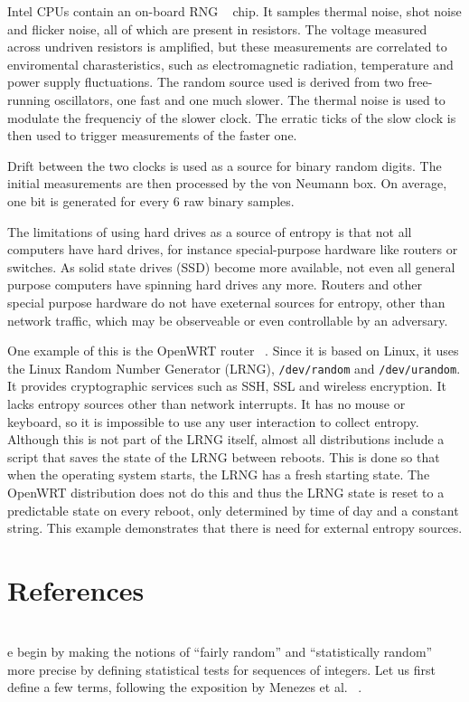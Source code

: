 \documentclass[a4paper]{article}           %
\newcommand{\tmpsection}[1]{}
\let\tmpsection=\section
\renewcommand{\section}[2]{

    \ifthenelse{
      \equal{#2}{*} %
    }
    {
      \tmpsection{References}
      \tmpsection{\sc{#2} }
    }
    {\tmpsection{\sc{#1} } }
      

}
\begin{document}
Intel CPUs contain an on-board RNG ~\cite{intel} chip. It samples thermal noise, shot noise and flicker noise, all of which are present in resistors. The voltage measured across undriven resistors is amplified, but these measurements are correlated to enviromental charasteristics, such as electromagnetic radiation, temperature and power supply fluctuations. The random source used is derived from two free-running oscillators, one fast and one much slower. The thermal noise is used to modulate the frequenciy of the slower clock. The erratic ticks of the slow clock is then used to trigger measurements of the faster one.

Drift between the two clocks is used as a source for binary random digits. The initial measurements are then processed by the von Neumann box. On average, one bit is generated for every 6 raw binary samples. 

The limitations of using hard drives as a source of entropy is that not all computers have hard drives, for instance special-purpose hardware like routers or switches. As solid state drives (SSD) become more available, not even all general purpose computers have spinning hard drives any more. Routers and other special purpose hardware do not have exeternal sources for entropy, other than network traffic, which may be observeable or even controllable by an adversary. 

One example of this is the OpenWRT router ~\cite{lrng}. Since it is based on Linux, it uses the Linux Random Number Generator (LRNG), \texttt{/dev/random} and \texttt{/dev/urandom}. It provides cryptographic services such as SSH, SSL and wireless encryption. It lacks entropy sources other than network interrupts. It has no mouse or keyboard, so it is impossible to use any user interaction to collect entropy. Although this is not part of the LRNG itself, almost all distributions include a script that saves the state of the LRNG between reboots. This is done so that when the operating system starts, the LRNG has a fresh starting state. The OpenWRT distribution does not do this and thus the LRNG state is reset to a predictable state on every reboot, only determined by time of day and a constant string. This example demonstrates that there is need for external entropy sources. 


\section{Theoretical Considerations}

We begin by making the notions of ``fairly random'' and ``statistically random'' more precise by defining statistical tests for sequences of integers. Let us first define a few terms, following the exposition by Menezes et al. ~\cite{menezes1996}.
\end{document}
